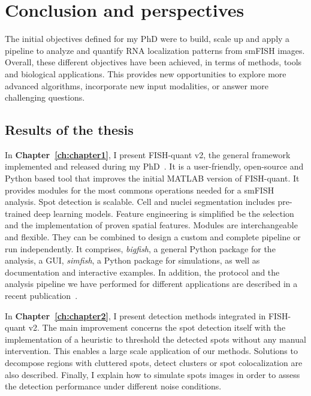 
\chapter{Conclusion and perspectives}
\label{ch:conclusion}

\minitoc
\newpage

The initial objectives defined for my PhD were to build, scale up and apply a pipeline to analyze and quantify \ac{RNA} localization patterns from \ac{smFISH} images.
Overall, these different objectives have been achieved, in terms of methods, tools and biological applications.
This provides new opportunities to explore more advanced algorithms, incorporate new input modalities, or answer more challenging questions.

\section{Results of the thesis}
\label{sec:conclusion_thesis}

In \textbf{Chapter~\ref{ch:chapter1}}, I present FISH-quant v2, the general framework implemented and released during my PhD~\cite{Imbert_fq_2022}.
It is a user-friendly, open-source and Python based tool that improves the initial MATLAB version of FISH-quant.
It provides modules for the most commons operations needed for a \ac{smFISH} analysis.
Spot detection is scalable.
Cell and nuclei segmentation includes pre-trained deep learning models.
Feature engineering is simplified be the selection and the implementation of proven spatial features.
Modules are interchangeable and flexible.
They can be combined to design a custom and complete pipeline or run independently.
It comprises, \emph{bigfish}, a general Python package for the analysis, a \ac{GUI}, \emph{simfish}, a Python package for simulations, as well as documentation and interactive examples.
In addition, the protocol and the analysis pipeline we have performed for different applications are described in a recent publication~\cite{safieddine_ht_smfish_2022}.

In \textbf{Chapter~\ref{ch:chapter2}}, I present detection methods integrated in FISH-quant v2.
The main improvement concerns the spot detection itself with the implementation of a heuristic to threshold the detected spots without any manual intervention.
This enables a large scale application of our methods.
Solutions to decompose regions with cluttered spots, detect clusters or spot colocalization are also described.
Finally, I explain how to simulate spots images in order to assess the detection performance under different noise conditions.

